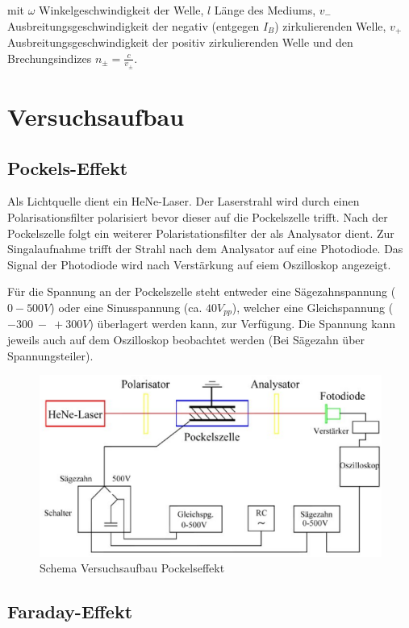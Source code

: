 \documentclass[12pt]{article}
\begin{document}
mit $\omega$ Winkelgeschwindigkeit der Welle, $l$ Länge des Mediums, $v_-$ Ausbreitungsgeschwindigkeit der negativ (entgegen $I_B$) zirkulierenden Welle, $v_+$ Ausbreitungsgeschwindigkeit der positiv zirkulierenden Welle und den Brechungsindizes $n_\pm = \frac{c}{v_\pm}$.




\section{Versuchsaufbau}

\subsection{Pockels-Effekt}

Als Lichtquelle dient ein HeNe-Laser. Der Laserstrahl wird durch einen Polarisationsfilter polarisiert bevor dieser auf die Pockelszelle trifft. Nach der Pockelszelle folgt ein weiterer Polaristationsfilter der als Analysator dient. Zur Singalaufnahme trifft der Strahl nach dem Analysator auf eine Photodiode. Das Signal der Photodiode wird nach Verstärkung auf eiem Oszilloskop angezeigt.

Für die Spannung an der Pockelszelle steht entweder eine Sägezahnspannung ($0 - 500V$) oder eine Sinusspannung (ca. $40V_{pp}$), welcher eine Gleichspannung ($-300~-~+300V$) überlagert werden kann, zur Verfügung. Die Spannung kann jeweils auch auf dem Oszilloskop beobachtet werden (Bei Sägezahn über Spannungsteiler).

\begin{figure}[H]
\centering
\includegraphics[width=0.9\linewidth]{pictures/aufbau-pockels.eps}
\caption{Schema Versuchsaufbau Pockelseffekt}
\end{figure}

\subsection{Faraday-Effekt}
\end{document}
